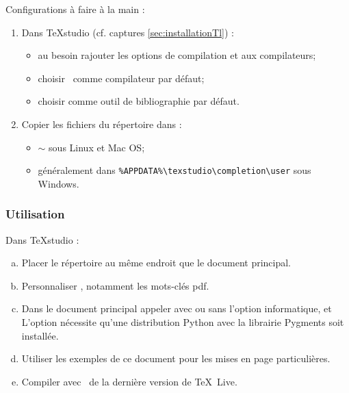 Configurations à faire à la main :
\begin{enumerate}
	\item Dans TeXstudio (cf. captures \ref{sec:installationTl}) :
		\begin{itemize}
			\item au besoin rajouter les options de compilation  et  aux compilateurs;
			\item choisir \XeLaTeX \ comme compilateur par défaut;
			\item choisir  comme outil de bibliographie par défaut.
		\end{itemize}
	\item Copier les fichiers du répertoire  dans :
		\begin{itemize}
			\item $\sim$ sous Linux et Mac OS;
			\item généralement dans \lstinline!%APPDATA%\texstudio\completion\user! sous Windows.
		\end{itemize}
\end{enumerate}


\subsubsection{Utilisation}

Dans TeXstudio :

\begin{enumerate}[a.]
	\item Placer le répertoire  au même endroit que le document principal.
	\item Personnaliser , notamment les mots-clés pdf.
	\item Dans le document principal appeler \inlatex{\usepackage[informatique]{styles/preambule_college}} avec ou sans l'option informatique, et \inlatex{\usepackage{styles/preambule_personnalisation}}
		\attention L'option  nécessite qu'une distribution Python avec la librairie Pygments soit installée.
	\item Utiliser les exemples de ce document pour les mises en page particulières.
	\item Compiler avec \XeLaTeX \ de la dernière version de \TeX \ Live.
\end{enumerate}





